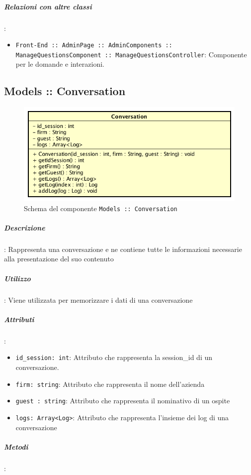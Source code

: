 \documentclass[../ManualeSviluppatore_v1.0.0.tex]{subfiles}
\begin{document}
		\subparagraph{Relazioni con altre classi}:
		      \begin{itemize}
		      	\item \texttt{Front-End :: AdminPage :: AdminComponents :: ManageQuestionsComponent :: ManageQuestionsController}: Componente per le domande e interazioni.
		      \end{itemize}


\newpage
	\subsection{Models :: Conversation}
	\begin{figure}[!h]
		\centering
		\includegraphics[scale=0.6]{Architettura/Front-End/Models/Conversation.png}
		\caption{Schema del componente \texttt{Models :: Conversation}}
	\end{figure}
		\subparagraph{Descrizione}: Rappresenta una conversazione e ne contiene tutte le informazioni necessarie alla presentazione del suo contenuto
		\subparagraph{Utilizzo}: Viene utilizzata per memorizzare i dati di una conversazione
		\subparagraph{Attributi}:
				\begin{itemize}
					\item \texttt{id\_session: int}: Attributo che rappresenta la session\_id di un conversazione.

					\item \texttt{firm: string}: Attributo che rappresenta il nome dell'azienda

					\item \texttt{guest : string}: Attributo che rappresenta il nominativo di un ospite

					\item \texttt{logs: Array<Log>}: Attributo che rappresenta l'insieme dei log di una conversazione
				\end{itemize}
			\subparagraph{Metodi}:
\end{document}
